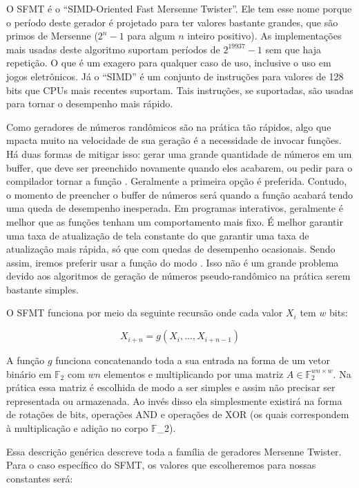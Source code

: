 

O SFMT é o ``SIMD-Oriented Fast Mersenne Twister''. Ele tem esse nome
porque o período deste gerador é projetado para ter valores bastante
grandes, que são primos de Mersenne ($2^n-1$ para algum $n$ inteiro
positivo). As implementações mais usadas deste algoritmo suportam
períodos de $2^{19937}-1$ sem que haja repetição. O que é um exagero
para qualquer caso de uso, inclusive o uso em jogos eletrônicos. Já o
``SIMD'' é um conjunto de instruções para valores de 128 bits que CPUs
mais recentes suportam. Tais instruções, se suportadas, são usadas
para tornar o desempenho mais rápido.

Como geradores de números randômicos são na prática tão rápidos, algo
que mpacta muito na velocidade de sua geração é a necessidade de
invocar funções. Há duas formas de mitigar isso: gerar uma grande
quantidade de números em um buffer, que deve ser preenchido novamente
quando eles acabarem, ou pedir para o compilador tornar a
função . Geralmente a primeira opção é
preferida. Contudo, o momento de preencher o buffer de números será
quando a função acabará tendo uma queda de desempenho inesperada. Em
programas interativos, geralmente é melhor que as funções tenham um
comportamento mais fixo. É melhor garantir uma taxa de atualização de
tela constante do que garantir uma taxa de atualização mais rápida, só
que com quedas de desempenho ocasionais. Sendo assim, iremos preferir
usar a função do modo . Isso não é um grande
problema devido aos algoritmos de geração de números pseudo-randômico
na prática serem bastante simples.

O SFMT funciona por meio da seguinte recursão onde cada valor $X_i$ tem
$w$ bits:

$$
X_{i+n}=g(X_i, \ldots, X_{i+n-1})
$$

A função $g$ funciona concatenando toda a sua entrada na forma de um
vetor binário em $\mathbb{F}_2$ com $wn$ elementos e multiplicando por
uma matriz $A\in\mathbb{F}_2^{wn\times w}$. Na prática essa matriz é
escolhida de modo a ser simples e assim não precisar ser representada
ou armazenada. Ao invés disso ela simplesmente existirá na forma de
rotações de bits, operações AND e operações de XOR (os quais
correspondem à multiplicação e adição no corpo $\mathbb{F}$_2).

Essa descrição genérica descreve toda a família de geradores Mersenne
Twister. Para o caso específico do SFMT, os valores que escolheremos
para nossas constantes será:

